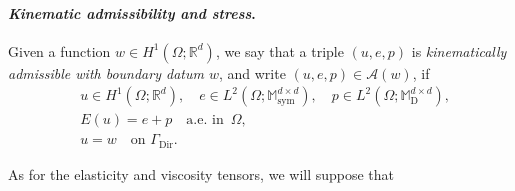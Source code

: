 \documentclass[a4paper,10pt,reqno]{amsart}
\numberwithin{equation}{section}
\newcommand{\bbM}{\mathbb{M}}
\newcommand{\R}{\mathbb{R}}
\numberwithin{equation}{section}
\newcommand{\aein}{\text{a.e.\ in }}
\newcommand{\sig}[1]{E(#1)}
\newcommand{\Dir}{\mathrm{Dir}}
\newcommand{\bbE}{\mathbb{E}}
\newcommand{\mt}{\bbM}
\newcommand{\sym}{\mathrm{sym}}
\newcommand{\dev}{\mathrm{D}}
\newcommand{\EEE}{\color{black}}
\begin{document}
\paragraph{{\em Kinematic admissibility and stress}.}  
Given a function $w \in H^1(\Omega;\R^d)$,  we say that a triple $(u,e,p)$ is \emph{kinematically admissible with boundary datum $w$}, and write $(u,e,p) \in \mathcal{A}(w)$,  if
\begin{subequations}
\label{kin-adm}
\begin{align}
&
u \in H^1(\Omega;\R^d), \quad e \in L^2(\Omega;\mt_\sym^{d\times d}), \quad p \in L^2(\Omega;\mt_\dev^{d\times d}),
\\
& \sig u = e+p \quad \aein\, \Omega,
\\
& 
u = w \quad \text{on } \Gamma_\Dir.
\end{align}
\end{subequations}
\par
 As for the elasticity and  viscosity %
   tensors,  we will suppose that 
\end{document}
